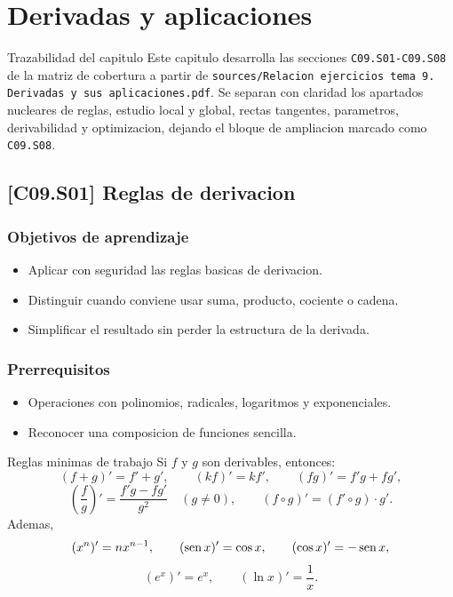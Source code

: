 \chapter{Derivadas y aplicaciones}

\begin{theorybox}{Trazabilidad del capitulo}
Este capitulo desarrolla las secciones \texttt{C09.S01-C09.S08} de la matriz de cobertura a
partir de \texttt{sources/Relacion ejercicios tema 9. Derivadas y sus aplicaciones.pdf}. Se
separan con claridad los apartados nucleares de reglas, estudio local y global, rectas
tangentes, parametros, derivabilidad y optimizacion, dejando el bloque de ampliacion marcado
como \texttt{C09.S08}.
\end{theorybox}

\section{[C09.S01] Reglas de derivacion}

\subsection*{Objetivos de aprendizaje}
\begin{itemize}
  \item Aplicar con seguridad las reglas basicas de derivacion.
  \item Distinguir cuando conviene usar suma, producto, cociente o cadena.
  \item Simplificar el resultado sin perder la estructura de la derivada.
\end{itemize}

\subsection*{Prerrequisitos}
\begin{itemize}
  \item Operaciones con polinomios, radicales, logaritmos y exponenciales.
  \item Reconocer una composicion de funciones sencilla.
\end{itemize}

\begin{theorybox}{Reglas minimas de trabajo}
Si \(f\) y \(g\) son derivables, entonces:
\[
(f+g)'=f'+g',\qquad (kf)'=kf',\qquad (fg)'=f'g+fg',
\]
\[
\left(\frac{f}{g}\right)'=\frac{f'g-fg'}{g^2}\quad (g\neq 0),
\qquad (f\circ g)'=(f'\circ g)\cdot g'.
\]
Ademas,
\[
(x^n)'=nx^{n-1},\qquad (\operatorname{sen} x)'=\cos x,\qquad (\cos x)'=-\operatorname{sen} x,
\]
\[
(e^x)'=e^x,\qquad (\ln x)'=\frac{1}{x}.
\]
\end{theorybox}

